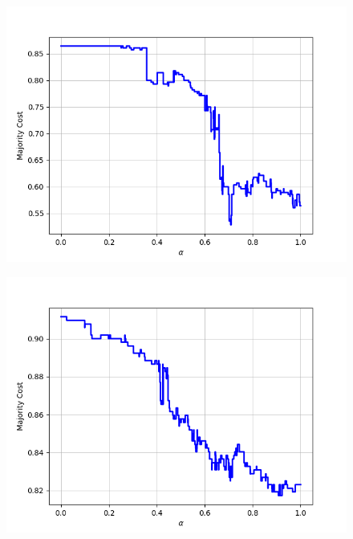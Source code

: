 \begin{figure}[H]
\begin{minipage}{.24\textwidth}
  {\includegraphics[width=\linewidth]{plots/omniglot-intra-sc/Bengali}}
\end{minipage}
\begin{minipage}{.24\textwidth}
  \centering
  {\includegraphics[width=\linewidth]{plots/omniglot-intra-sc/Blackfoot_(Canadian_Aboriginal_Syllabics)}}
\end{minipage}
\begin{minipage}{.24\textwidth}
  \centering

\end{minipage}
\end{figure}
